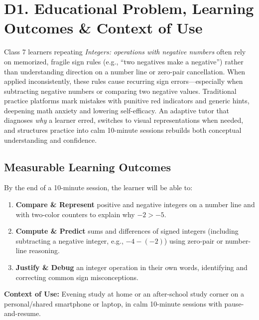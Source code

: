 \documentclass[10pt,a4paper]{article}
\begin{document}
\section*{D1. Educational Problem, Learning Outcomes \& Context of Use}
Class 7 learners repeating \emph{Integers: operations with negative numbers} often rely on memorized, fragile sign rules (e.g., ``two negatives make a negative'') rather than understanding direction on a number line or zero-pair cancellation. When applied inconsistently, these rules cause recurring sign errors---especially when subtracting negative numbers or comparing two negative values. Traditional practice platforms mark mistakes with punitive red indicators and generic hints, deepening math anxiety and lowering self-efficacy. An adaptive tutor that diagnoses \emph{why} a learner erred, switches to visual representations when needed, and structures practice into calm 10-minute sessions rebuilds both conceptual understanding and confidence.

\subsection*{Measurable Learning Outcomes}
By the end of a 10-minute session, the learner will be able to:
\begin{enumerate}
  \item \textbf{Compare \& Represent} positive and negative integers on a number line and with two-color counters to explain why $-2 > -5$.
  \item \textbf{Compute \& Predict} sums and differences of signed integers (including subtracting a negative integer, e.g., $-4 - (-2)$) using zero-pair or number-line reasoning.
  \item \textbf{Justify \& Debug} an integer operation in their own words, identifying and correcting common sign misconceptions.
\end{enumerate}
\textbf{Context of Use:} Evening study at home or an after-school study corner on a personal/shared smartphone or laptop, in calm 10-minute sessions with pause-and-resume.
\end{document}
